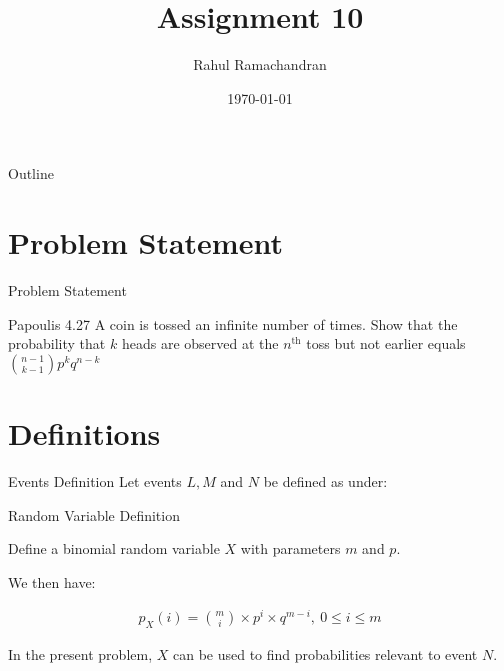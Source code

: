 \documentclass{beamer}
\title{Assignment 10}
\author{Rahul Ramachandran}
\date{\today}
\begin{document}
\begin{frame}
    \titlepage 
\end{frame}

\logo{}


\begin{frame}{Outline}
    \tableofcontents
\end{frame}



\section{Problem Statement}
\begin{frame}{Problem Statement}
    \begin{block}{Papoulis 4.27 } A coin is tossed an infinite number of times. Show that the probability that $k$ heads are observed at the $n^{\text{th}}$ toss but not earlier equals $\binom{n-1}{k-1}p^{k}q^{n-k}$     \end{block}
\end{frame}

\section{Definitions}
\begin{frame}{Events Definition}
Let events $L,M$ and $N$ be defined as under:

\begin{table}[ht!]
    \centering
    
	\label{table:table1}
\end{table}

\end{frame}

\begin{frame}{Random Variable Definition}

Define a binomial random variable $X$ with parameters $m$ and $p$.

We then have:
\begin{block}{}
       \begin{align}
                \label{eq1}
           p_X{(i)} = \binom{m}{i} \times p^i \times q^{m-i}  ,~ 0 \le i \le m
       \end{align}
\end{block}

In the present problem, $X$ can be used to find probabilities relevant to event $N$.
\end{frame}
\end{document}
